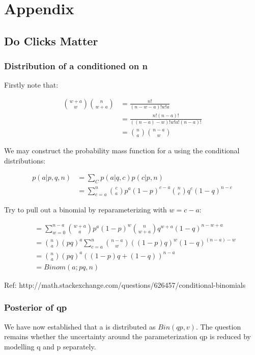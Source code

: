 \documentclass[11pt,a4,singlespacing,titlepagenumber=on]{scrreprt}
\numberwithin{equation}{chapter} %
\theoremstyle{remark}
\begin{document}
\chapter{Appendix}

\section{Do Clicks Matter}

\subsection{Distribution of a conditioned on n}

Firstly note that:

\begin{align}
{w+a \choose w}{n \choose w+a} &= \frac{n!}{(n-w-a)!w!a} \\
	&= \frac{n!(n-a)!}{((n-a)-w)!w!a!(n-a)!} \\
	&=  {n \choose a}{n-a \choose w}
\end{align}

We may construct the probability mass function for a using the conditional distributions:

\begin{align}
p(a|p,q,n) &= \sum_C p(a|q,c)p(c|p,n) \\
 &= \sum_{c=a}^n {c \choose a} p^a(1-p)^{c-a} {n \choose c} q^c (1-q)^{n-c}
\end{align}

Try to pull out a binomial by reparameterizing with $ w = c-a$:

\begin{align}
&= \sum_{w=0}^{n-a} {w+a \choose a} p^a(1-p)^w {n \choose w+a} q^{w+a} (1-q)^{n-w+a} \\
&= {n \choose a} (pq)^a \sum_{c=a}^n {n-a \choose w} ((1-p)q)^w (1-q)^{(n-a)-w} \\
&= {n \choose a} (pq)^a ((1-p)q +  (1-q))^{n-a} \\
&= Binom(a;pq,n)
\end{align}

Ref: http://math.stackexchange.com/questions/626457/conditional-binomials

\subsection{Posterior of qp}

We have now established that a is distributed as $Bin(qp,v)$. The question remains whether the uncertainty around the parameterization qp is reduced by modelling q and p separately.
\end{document}
